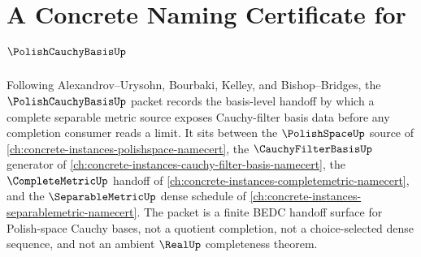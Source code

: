\chapter{A Concrete Naming Certificate for $\PolishCauchyBasisUp$}
\label{ch:concrete-instances-polish-cauchy-basis-namecert}

Following Alexandrov--Urysohn, Bourbaki, Kelley, and Bishop--Bridges, the
$\PolishCauchyBasisUp$ packet records the basis-level handoff by which a
complete separable metric source exposes Cauchy-filter basis data before any
completion consumer reads a limit. It sits between the $\PolishSpaceUp$ source
of \autoref{ch:concrete-instances-polishspace-namecert}, the
$\CauchyFilterBasisUp$ generator of
\autoref{ch:concrete-instances-cauchy-filter-basis-namecert}, the
$\CompleteMetricUp$ handoff of
\autoref{ch:concrete-instances-completemetric-namecert}, and the
$\SeparableMetricUp$ dense schedule of
\autoref{ch:concrete-instances-separablemetric-namecert}. The packet is a
finite BEDC handoff surface for Polish-space Cauchy bases, not a quotient
completion, not a choice-selected dense sequence, and not an ambient
$\RealUp$ completeness theorem.

